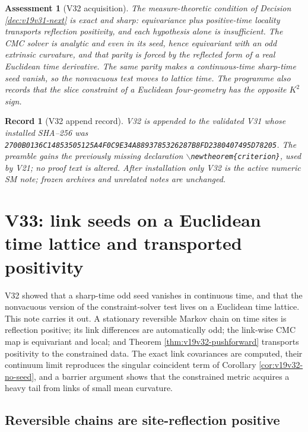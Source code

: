 \documentclass[11pt]{article}
\newtheorem{assessment}[theorem]{Assessment}
\newtheorem{record}[theorem]{Record}
\theoremstyle{remark}
\begin{document}
\begin{assessment}[V32 acquisition]
\label{ass:v19v32}
The measure-theoretic condition of Decision \ref{dec:v19v31-next} is
exact and sharp: equivariance plus positive-time locality transports
reflection positivity, and each hypothesis alone is insufficient.  The
CMC solver is analytic and even in its seed, hence equivariant with an
odd extrinsic curvature, and that parity is forced by the reflected form
of a real Euclidean time derivative.  The same parity makes a
continuous-time sharp-time seed vanish, so the nonvacuous test moves to
lattice time.  The programme also records that the slice constraint of a
Euclidean four-geometry has the opposite \(K^2\) sign.
\end{assessment}

\begin{record}[V32 append record]
\label{rec:v19v32}
V32 is appended to the validated V31 whose installed SHA--256 was
\texttt{2700B0136C14853505125A4F0C9E34A8893785326287B8FD2380407495D78205}.
The preamble gains the previously missing declaration
\(\backslash\)\texttt{newtheorem\{criterion\}}, used by V21; no proof text
is altered.  After installation only V32 is the active numeric SM note;
frozen archives and unrelated notes are unchanged.
\end{record}


\section{V33: link seeds on a Euclidean time lattice and transported positivity}
\label{sec:v19v33}

V32 showed that a sharp-time odd seed vanishes in continuous time, and
that the nonvacuous version of the constraint-solver test lives on a
Euclidean time lattice.  This note carries it out.  A stationary
reversible Markov chain on time sites is reflection positive; its link
differences are automatically odd; the link-wise CMC map is equivariant
and local; and Theorem \ref{thm:v19v32-pushforward} transports positivity
to the constrained data.  The exact link covariances are computed, their
continuum limit reproduces the singular coincident term of Corollary
\ref{cor:v19v32-no-seed}, and a barrier argument shows that the
constrained metric acquires a heavy tail from links of small mean
curvature.

\subsection{Reversible chains are site-reflection positive}
\end{document}
